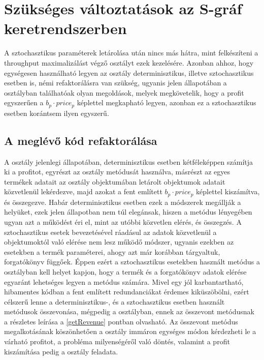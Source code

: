 \section{Szükséges változtatások az S-gráf keretrendszerben} \label{refactor}
A sztochasztikus paraméterek letárolása után nincs más hátra, mint felkészíteni a throughput maximalizálást végző  osztályt ezek kezelésére.
Azonban ahhoz, hogy egységesen használható legyen az osztály determinisztikus, illetve sztochasztikus esetben is, némi refaktorálásra van szükség, ugyanis jelen állapotában a  osztályban találhatóak olyan megoldások, melyek megkövetelik, hogy a profit egyszerűen a $b_p\cdot price_p$ képlettel megkapható legyen, azonban ez a sztochasztikus esetben korántsem ilyen egyszerű.
\subsection{A meglévő kód refaktorálása}
A  osztály jelenlegi állapotában, determinisztikus esetben kétféleképpen számítja ki a profitot, egyrészt az  osztály  metódusát használva, másrészt az egyes termékek adatait az  osztály  objektumában letárolt  objektumok adatait közvetlenül lekérdezve, majd azokat a fent említett $b_p\cdot price_p$ képlettel kiszámítva, és összegezve.
Habár determinisztikus esetben ezek a módszerek megállják a helyüket, ezek jelen állapotban nem túl elegánsak, hiszen a  metódus lényegében ugyan azt a működést éri el, mint az utóbbi közvetlen elérés, és összegzés.
A sztochasztikus esetek bevezetésével ráadásul az adatok közvetlenül a  objektumoktól való elérése nem lesz működő módszer, ugyanis ezekben az esetekben a termék paraméterei, ahogy azt már korábban tárgyaltuk, forgatókönyv függőek.
Éppen ezért a sztochasztikus esetekben használt  metódus a  osztályban kell helyet kapjon, hogy a termék és a forgatókönyv adatok elérése egyaránt lehetséges legyen a metódus számára.
Mivel egy jól karbantartható, hibamentes kódban a fent említett redundanciákat érdemes kiküszöbölni, ezért célszerű lenne a determinisztikus-, és a sztochasztikus esetben használt  metódusok összevonása, mégpedig a  osztályban, ennek az összevont metódusnak a részletes leírása a \ref{getRevenue} pontban olvasható.
Az összevont  metódus megalkotásának köszönhetően a  osztály immáron egységes módon kérdezheti le a várható profitot, a probléma milyenségéről való döntés, valamint a profit kiszámítása pedig a  osztály feladata.
